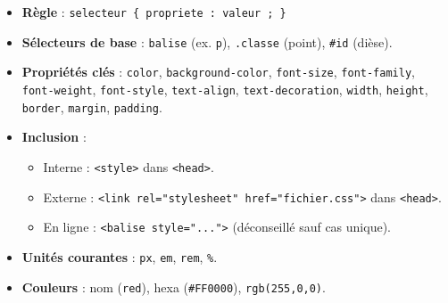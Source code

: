 \documentclass[11pt]{article}
\begin{document}
\begin{aretenir}
\begin{itemize}
  \item \textbf{Règle} : \texttt{selecteur \{ propriete : valeur ; \}}
  \item \textbf{Sélecteurs de base} : \texttt{balise} (ex. \texttt{p}), \texttt{.classe} (point), \texttt{\#id} (dièse).
  \item \textbf{Propriétés clés} : \texttt{color}, \texttt{background-color}, \texttt{font-size}, \texttt{font-family}, \texttt{font-weight}, \texttt{font-style}, \texttt{text-align}, \texttt{text-decoration}, \texttt{width}, \texttt{height}, \texttt{border}, \texttt{margin}, \texttt{padding}.
  \item \textbf{Inclusion} :
  \begin{itemize}
    \item Interne : \texttt{<style>} dans \texttt{<head>}.
    \item Externe : \texttt{<link rel="stylesheet" href="fichier.css">} dans \texttt{<head>}.
    \item En ligne : \texttt{<balise style="...">} (déconseillé sauf cas unique).
  \end{itemize}
  \item \textbf{Unités courantes} : \texttt{px}, \texttt{em}, \texttt{rem}, \texttt{\%}.
  \item \textbf{Couleurs} : nom (\texttt{red}), hexa (\texttt{\#FF0000}), \texttt{rgb(255,0,0)}.
\end{itemize}
\end{aretenir}
\end{document}
